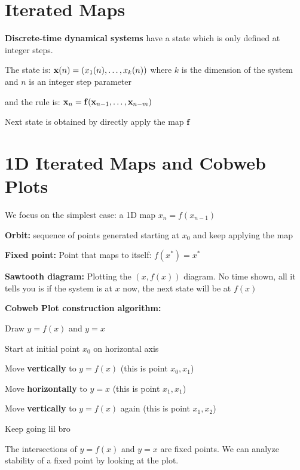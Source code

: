 \section*{Iterated Maps}

\textbf{Discrete-time dynamical systems} have a state which is only 
defined at integer steps. 

The state is:
$\mathbf{x}(n) = (x_1(n), \dots, x_k(n))$
where $k$ is the dimension of the system and $n$ is an integer step parameter

and the rule is: $\mathbf{x}_n = \mathbf{f}(\mathbf{x}_{n-1}, \dots, \mathbf{x}_{n-m})$

Next state is obtained by directly apply the map $\mathbf{f}$

\section*{1D Iterated Maps and Cobweb Plots}

We focus on the simplest case: a 1D map $x_n = f(x_{n-1})$

\begin{tightitemize}
    \item \textbf{Orbit:} sequence of points generated starting at $x_0$
    and keep applying the map 
    \item \textbf{Fixed point:} Point that maps to itself: $f(x^*) = x^*$
\end{tightitemize}

\textbf{Sawtooth diagram:} Plotting the $(x, f(x))$ diagram. No time shown, 
all it tells you is if the system is at $x$ now, the next state will be at $f(x)$

\textbf{Cobweb Plot construction algorithm:}

\begin{tightitemize}
    \item Draw $y=f(x)$ and $y=x$
    \item Start at initial point $x_0$ on horizontal axis 
    \item Move \textbf{vertically} to $y = f(x)$ (this is point $x_0, x_1$)
    \item Move \textbf{horizontally} to $y = x$ (this is point $x_1, x_1$)
    \item Move \textbf{vertically} to $y = f(x)$ again (this is point $x_1, x_2$)
    \item Keep going lil bro
\end{tightitemize}

The intersections of $y = f(x)$ and $y = x$ are fixed points. We can analyze 
stability of a fixed point by looking at the plot.

